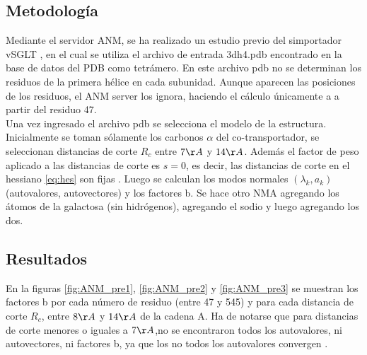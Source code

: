 \subsection{Metodolog\'{i}a}
Mediante el servidor ANM, se ha realizado un estudio previo del simportador vSGLT \cite{Cabrera2017} , en el cual se utiliza el archivo de entrada 3dh4.pdb \cite{Faham2008} encontrado en la base de datos del PDB como tetr\'{a}mero. En este archivo pdb no se determinan los residuos de la primera h\'{e}lice en cada subunidad. Aunque aparecen las posiciones de los residuos, el ANM server los ignora, haciendo el c\'{a}lculo \'{u}nicamente a a partir del residuo 47.\\

Una vez ingresado el archivo pdb se selecciona el modelo de la estructura. Inicialmente se toman s\'{o}lamente los carbonos $\alpha$ del co-transportador, se seleccionan distancias de corte $R_c$ entre $7\AA$ y $14\AA$. Adem\'{a}s el factor de peso aplicado a las distancias de corte es $s=0$, es decir, las distancias de corte en el hessiano \eqref{eq:hes} son fijas \cite{Zimmermann2011}. Luego se calculan los modos normales $(\lambda_k,a_k)$ (autovalores, autovectores) y los factores b. Se hace otro NMA agregando los \'{a}tomos de la galactosa (sin hidr\'{o}genos), agregando el sodio y luego agregando los dos.\\
\subsection{Resultados}
En la figuras \ref{fig:ANM_pre1}, \ref{fig:ANM_pre2} y \ref{fig:ANM_pre3} se muestran los factores b por cada n\'{u}mero de residuo (entre 47 y 545) y para cada distancia de corte $R_c$, entre $8\AA$ y $14\AA$ de la cadena A. Ha de notarse que para distancias de corte menores o iguales a $7\AA$,no se encontraron todos  los autovalores, ni autovectores, ni factores b, ya que los no todos los autovalores convergen \cite{Zimmermann2011}.\\

